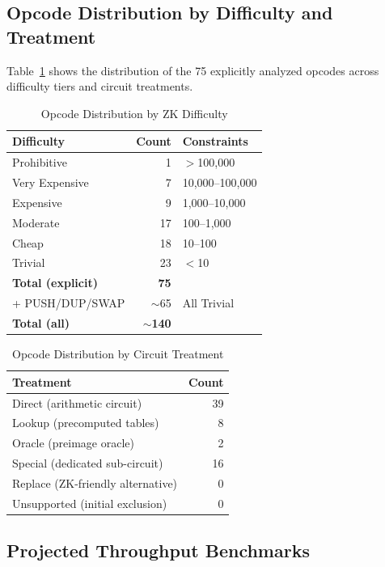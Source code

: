 \subsection{Opcode Distribution by Difficulty and Treatment}

Table~\ref{tab:opcode-distribution} shows the distribution of the 75
explicitly analyzed opcodes across difficulty tiers and circuit treatments.

\begin{table}[htbp]
\caption{Opcode Distribution by ZK Difficulty}
\label{tab:opcode-distribution}
\centering
\begin{tabular}{lrl}
\toprule
\textbf{Difficulty} & \textbf{Count} & \textbf{Constraints} \\
\midrule
Prohibitive & 1 & $>$100{,}000 \\
Very Expensive & 7 & 10{,}000--100{,}000 \\
Expensive & 9 & 1{,}000--10{,}000 \\
Moderate & 17 & 100--1{,}000 \\
Cheap & 18 & 10--100 \\
Trivial & 23 & $<$10 \\
\midrule
\textbf{Total (explicit)} & \textbf{75} & \\
+ PUSH/DUP/SWAP & ${\sim}$65 & All Trivial \\
\midrule
\textbf{Total (all)} & ${\sim}$\textbf{140} & \\
\bottomrule
\end{tabular}
\end{table}

\begin{table}[htbp]
\caption{Opcode Distribution by Circuit Treatment}
\label{tab:opcode-treatment}
\centering
\begin{tabular}{lr}
\toprule
\textbf{Treatment} & \textbf{Count} \\
\midrule
Direct (arithmetic circuit) & 39 \\
Lookup (precomputed tables) & 8 \\
Oracle (preimage oracle) & 2 \\
Special (dedicated sub-circuit) & 16 \\
Replace (ZK-friendly alternative) & 0 \\
Unsupported (initial exclusion) & 0 \\
\bottomrule
\end{tabular}
\end{table}

\subsection{Projected Throughput Benchmarks}

